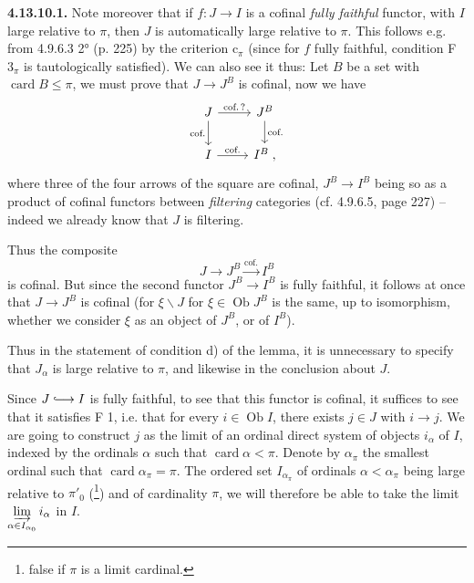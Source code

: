 \documentclass[11pt]{article}
\newcommand{\printedpage}[1]{\marginpar{\footnotesize p.~#1}}
\newcommand{\msp}[1]{\marginpar{\footnotesize [#1]}}
\newcommand{\incl}{\lhook\joinrel\longrightarrow}
\newcommand{\card}{\operatorname{card}}
\newcommand{\Ob}{\operatorname{Ob}}
\begin{document}
\textbf{4.13.10.1.} Note moreover that if $f : J\longrightarrow I$ is a cofinal \textit{fully faithful} functor, with $I$ large relative to $\pi$, then $J$ is automatically large relative to $\pi$. This follows e.g. from 4.9.6.3 2° (p. 225) by the criterion $\mathrm{c}_\pi$ (since for $f$ fully faithful, condition F $3_\pi$ is tautologically satisfied). We can also see it thus: Let $B$ be a set with $\card B\leqslant\pi$, we must prove that $J\longrightarrow J^B$ is cofinal, now we have
\[
\begin{tikzcd}
J \arrow[r, "\text{cof.\,?}"] \arrow[d, "\text{cof.}"'] & J^B \arrow[d, "\text{cof.}"] \\
I \arrow[r, "\text{cof.}"] & I^B \; ,
\end{tikzcd}
\]
where three of the four arrows of the square are cofinal, $J^B\longrightarrow I^B$ being so as a product of cofinal functors between \textit{filtering} categories (cf. 4.9.6.5, page 227) -- indeed we already know that $J$ is filtering.

\msp{page 297}
Thus the composite
\[ J \longrightarrow J^B \xrightarrow{\text{cof.}} I^B \]
is cofinal. But since the second functor $J^B\longrightarrow I^B$ is fully faithful, it follows at once that $J\longrightarrow J^B$ is cofinal (for $\xi\backslash J$ for $\xi\in\Ob J^B$ is the same, up to isomorphism, whether we consider $\xi$ as an object of $J^B$, or of $I^B$).

Thus in the statement of condition d) of the lemma, it is unnecessary to specify that $J_\alpha$ is large relative to $\pi$, and likewise in the conclusion about $J$.

Since $J\incl I$ is fully faithful, to see that this functor is cofinal, it suffices to see that it satisfies F 1, i.e. that for every $i\in\Ob I$, there exists $j\in J$ with $i\longrightarrow j$. We are going to construct $j$ as the limit of an ordinal direct system of objects $i_\alpha$ of $I$, indexed by the ordinals $\alpha$ such that $\card\alpha<\pi$. Denote by $\alpha_\pi$ the smallest ordinal such that %
\printedpage{111}
\msp{page 298}
$\card\alpha_\pi=\pi$. The ordered set $I_{\alpha_\pi}$ of ordinals $\alpha<\alpha_\pi$ being large relative to $\pi'_0$ (\footnote[129]{false if $\pi$ is a limit cardinal.}) and of cardinality $\pi$, we will therefore be able to take the limit $\varinjlim\limits_{\alpha\in I_{\alpha_0}} i_\alpha$ in $I$. %
\end{document}
